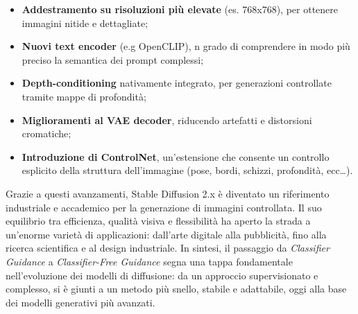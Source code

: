 \begin{itemize}
    \item \textbf{Addestramento su risoluzioni più elevate} (es. 768x768), per ottenere immagini nitide e dettagliate;
    \item \textbf{Nuovi text encoder} (e.g OpenCLIP), n grado di comprendere in modo più preciso la semantica dei prompt complessi;
    \item \textbf{Depth-conditioning} nativamente integrato, per generazioni controllate tramite mappe di profondità;
    \item \textbf{Miglioramenti al VAE decoder}, riducendo artefatti e distorsioni cromatiche;
    \item \textbf{Introduzione di ControlNet}, un’estensione che consente un controllo esplicito della struttura dell’immagine (pose, bordi, schizzi, profondità, ecc\ldots).
\end{itemize}

Grazie a questi avanzamenti, Stable Diffusion 2.x è diventato un riferimento industriale e accademico per la generazione di immagini controllata. Il suo equilibrio tra efficienza, qualità visiva e flessibilità ha aperto la strada a un’enorme varietà di applicazioni: dall’arte digitale alla pubblicità, fino alla ricerca scientifica e al design industriale. In sintesi, il passaggio da \textit{Classifier Guidance} a \textit{Classifier-Free Guidance} segna una tappa fondamentale nell’evoluzione dei modelli di diffusione: da un approccio supervisionato e complesso, si è giunti a un metodo più snello, stabile e adattabile, oggi alla base dei modelli generativi più avanzati.


